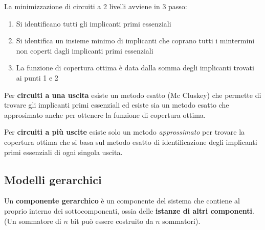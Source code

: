 \documentclass[a4paper]{article}
\theoremstyle{break}
\theoremstyle{break}
\theoremstyle{break}
\theoremstyle{break}
\begin{document}
La minimizzazione di circuiti a 2 livelli avviene in 3 passo:
\begin{enumerate}
    \item Si identificano tutti gli implicanti primi essenziali
    \item Si identifica un insieme minimo di implicanti che coprano tutti i mintermini non coperti
        dagli implicanti primi essenziali
    \item La funzione di copertura ottima è data dalla somma degli implicanti trovati ai punti 1 e 2
\end{enumerate}

Per \textbf{circuiti a una uscita} esiste un metodo esatto (Mc Cluskey) che permette di trovare gli implicanti
primi essenziali ed esiste sia un metodo esatto che approsimato anche per ottenere la funzione
di copertura ottima.

Per \textbf{circuiti a più uscite} esiste solo un metodo \emph{approssimato} per trovare la copertura ottima che si
basa sul metodo esatto di identificazione degli implicanti primi essenziali di ogni singola uscita.


\subsection{Modelli gerarchici}
Un \textbf{componente gerarchico} è un componente del sistema che contiene al proprio interno dei
sottocomponenti, ossia delle \textbf{istanze di altri componenti}. (Un sommatore di \( n \) bit
può essere costruito da \( n \) sommatori).
\end{document}
